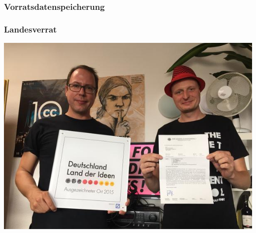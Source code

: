 \documentclass[12pt, xcolor={svgnames,table}]{beamer}
\begin{document}
\begin{frame}
  \frametitle{Vorratsdatenspeicherung}
    \begin{center}
    \end{center}
\end{frame}


\begin{frame}
  \frametitle{Landesverrat}
  \begin{center}
    \includegraphics[height=0.7\textheight]{img/landesverrat.jpg}
  \end{center}
\end{frame}
\end{document}
